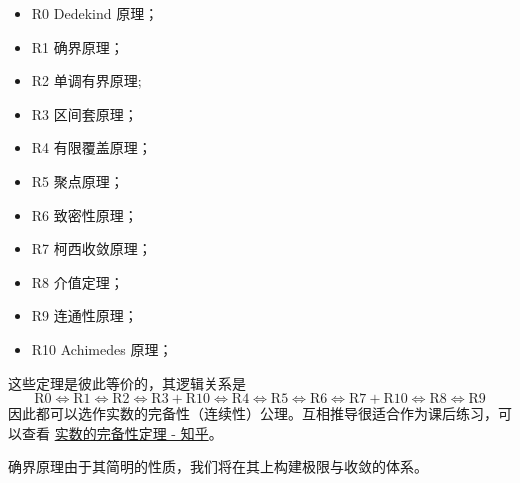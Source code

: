 \begin{itemize}
	\item R0 Dedekind 原理；
	\item R1 确界原理；
	\item R2 单调有界原理;
	\item R3 区间套原理；
	\item R4 有限覆盖原理；
	\item R5 聚点原理；
	\item R6 致密性原理；
	\item R7 柯西收敛原理；
	\item R8 介值定理；
	\item R9 连通性原理；
	\item R10 Achimedes 原理；
\end{itemize}

这些定理是彼此等价的，其逻辑关系是
\[ \mathrm{R0} \Leftrightarrow \mathrm{R1} \Leftrightarrow\mathrm{R2} \Leftrightarrow\mathrm{R3} + \mathrm{R10} \Leftrightarrow\mathrm{R4} \Leftrightarrow\mathrm{R5} \Leftrightarrow\mathrm{R6} \Leftrightarrow\mathrm{R7}+\mathrm{R10} \Leftrightarrow\mathrm{R8} \Leftrightarrow\text{R9}  \]
因此都可以选作实数的完备性（连续性）公理。互相推导很适合作为课后练习，可以查看 \href{https://zhuanlan.zhihu.com/p/48859870}{实数的完备性定理 - 知乎}。

确界原理由于其简明的性质，我们将在其上构建极限与收敛的体系。







